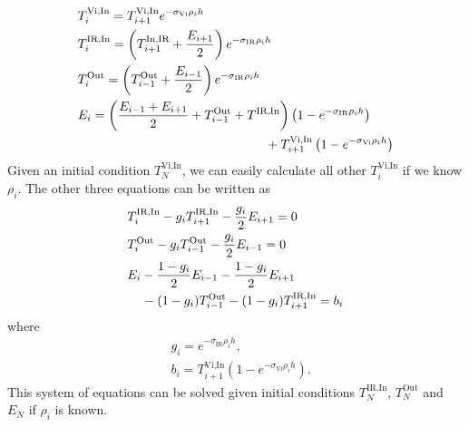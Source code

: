 \documentclass[twocolumn]{article}
\begin{document}
\begin{large}
\begin{equation*}
    \begin{split}
        &T_i^\text{Vi,In} = T_{i+1}^\text{Vi,In}e^{-\sigma_\text{Vi}\rho_ih} \\ 
        &T_i^\text{IR,In} = \left(T_{i+1}^\text{In,IR}+\frac{E_{i+1}}{2}\right)e^{-\sigma_\text{IR}\rho_ih} \\ 
        &T_i^\text{Out} = \left(T_{i-1}^\text{Out}+\frac{E_{i-1}}{2}\right)e^{-\sigma_\text{IR}\rho_ih} \\ 
        &E_i = \left(\frac{E_{i-1}+E_{i+1}}{2}+T^\text{Out}_{i-1}+T^\text{IR,In}\right)\left(1-e^{-\sigma_\text{IR}\rho_ih}\right) \\ 
        &\hspace{5.2cm} + T_{i+1}^\text{Vi,In}\left(1-e^{-\sigma_\text{Vi}\rho_ih}\right)
    \end{split}
\end{equation*}
Given an initial condition $T_N^\text{Vi,In}$, we can easily calculate all other $T_i^\text{Vi,In}$ if we know $\rho_i$. The other three equations can be written as 
\begin{equation}
    \begin{split}
        &T_i^\text{IR,In} - g_iT_{i+1}^\text{IR,In}-\frac{g_i}{2}E_{i+1} = 0 \\ 
        &T_i^\text{Out} - g_iT_{i-1}^\text{Out} - \frac{g_i}{2}E_{i-1} = 0\\ 
        &E_i - \frac{1-g_i}{2}E_{i-1} - \frac{1-g_i}{2}E_{i+1} \\ 
        &\hspace{0.4cm} - (1-g_i)T^\text{Out}_{i-1} - (1-g_i)T^\text{IR,In}_{i+1} = b_i
    \end{split}
\end{equation}
where 
\begin{equation}
    \begin{split}
        &g_i = e^{-\sigma_\text{IR}\rho_ih}, \\ 
        &b_i = T_{i+1}^\text{Vi,In}\left(1-e^{-\sigma_\text{Vi}\rho_ih}\right).
    \end{split}
\end{equation}
This system of equations can be solved given initial conditions $T^\text{IR,In}_N$, $T^\text{Out}_N$ and $E_N$ if $\rho_i$ is known.






\end{large}
\end{document}
